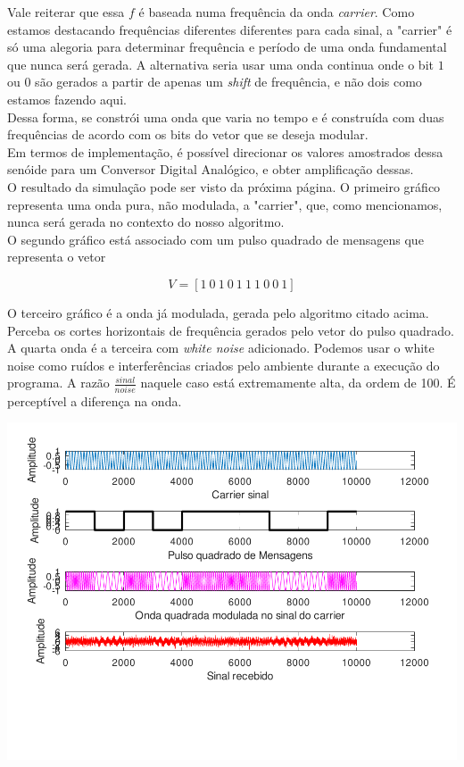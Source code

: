 \documentclass[11pt,a4paper]{report}
\begin{document}
	Vale reiterar que essa $f$ é baseada numa frequência da onda {\it carrier}. Como estamos destacando frequências diferentes diferentes para cada sinal, a "carrier" é só uma alegoria para determinar frequência e período de uma onda fundamental que nunca será gerada. A alternativa seria usar uma onda continua onde o bit $1$ ou $0$ são gerados a partir de apenas um {\it shift} de frequência, e não dois como estamos fazendo aqui.\\
	
	Dessa forma, se constrói uma onda que varia no tempo e é construída com duas frequências de acordo com os bits do vetor que se deseja modular.\\
	
	Em termos de implementação, é possível direcionar os valores amostrados dessa senóide para um Conversor Digital Analógico, e obter amplificação dessas.\\
	
	O resultado da simulação pode ser visto da próxima página. O primeiro gráfico representa uma onda pura, não modulada, a "carrier", que, como mencionamos, nunca será gerada no contexto do nosso algoritmo.\\
	
	O segundo gráfico está associado com um pulso quadrado de mensagens que representa o vetor 
	
	\[V = [1\ 0\ 1\ 0\ 1\ 1\ 1\ 0\ 0\ 1]\]
	
	O terceiro gráfico é a onda já modulada, gerada pelo algoritmo citado acima. Perceba os cortes horizontais de frequência gerados pelo vetor do pulso quadrado.\\
	
	A quarta onda é a terceira com {\it white noise} adicionado. Podemos usar o white noise como ruídos e interferências criados pelo ambiente durante a execução do programa. A razão $\frac{sinal}{noise}$ naquele caso está extremamente alta, da ordem de 100. É perceptível a diferença na onda.
	\begin{center}
	
	\includegraphics[clip, trim=0.0cm 0cm 0.0cm 0.0cm, width=1.00\textwidth]{sinais}
	
	\end{center}
\end{document}
